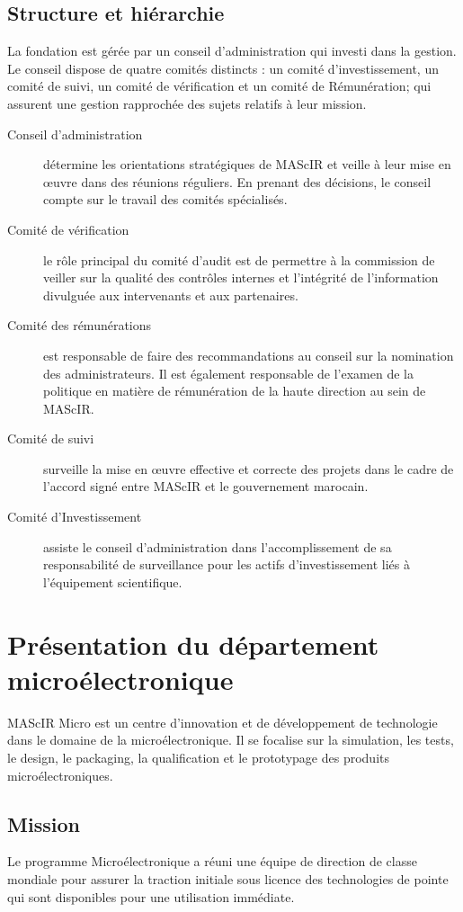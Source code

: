 \documentclass[11pt, a4paper, twoside]{book}
\begin{document}
\subsection{Structure et hiérarchie}
La fondation est gérée par un conseil d’administration qui  investi dans la gestion. Le conseil dispose de quatre comités distincts : un comité d’investissement, un comité de suivi, un comité de vérification et un comité de Rémunération; qui assurent une gestion rapprochée des sujets relatifs à leur mission.
\begin{description}
\item[Conseil d'administration] détermine les orientations stratégiques de MAScIR et veille à leur mise en œuvre dans des réunions réguliers. En prenant des décisions, le conseil compte sur le travail des comités spécialisés.
\item[Comité de vérification] le rôle principal du comité d'audit est de permettre à la commission de veiller sur la qualité des contrôles internes et l'intégrité de l'information divulguée aux intervenants et aux partenaires.
\item[Comité des rémunérations] est responsable de faire des recommandations au conseil sur la nomination des administrateurs. Il est également responsable de l'examen de la politique en matière de rémunération de la haute direction au sein de MAScIR.
\item[Comité de suivi] surveille la mise en œuvre effective et correcte des projets dans le cadre de l'accord signé entre MAScIR et le gouvernement marocain.
\item[Comité d'Investissement] assiste le conseil d'administration dans l'accomplissement de sa responsabilité de surveillance pour les actifs d'investissement liés à l'équipement scientifique.
\end{description}

\section{Présentation du département microélectronique}
MAScIR Micro est un centre d’innovation et de développement de technologie dans le domaine de la microélectronique. Il se focalise sur la simulation, les tests, le design, le packaging, la qualification et le prototypage des produits microélectroniques.
\subsection{Mission}
Le programme Microélectronique a réuni une équipe de direction de classe mondiale pour assurer la traction initiale sous licence des technologies de pointe qui sont disponibles pour une utilisation immédiate. \\
\end{document}
